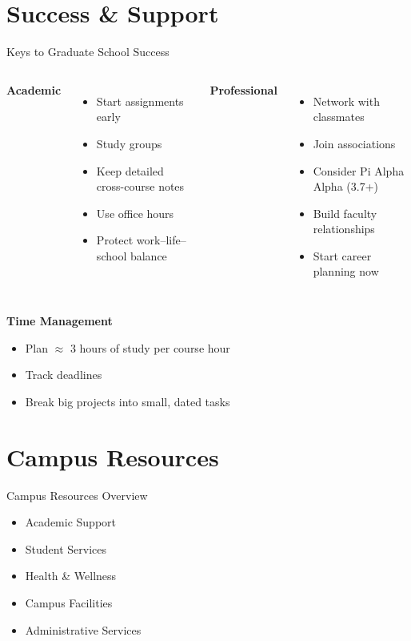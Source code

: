 \documentclass[10pt]{beamer}
\begin{document}
\section{\textcolor{titanorange}{Success \& Support}}
\begin{frame}{Keys to Graduate School Success}
\begin{columns}[T,onlytextwidth]
  \textbf{Academic}
  \begin{itemize}
    \item Start assignments early
    \item Study groups
    \item Keep detailed cross-course notes
    \item Use office hours
    \item Protect work--life--school balance
  \end{itemize}
  \textbf{Professional}
  \begin{itemize}
    \item Network with classmates
    \item Join associations
    \item Consider Pi Alpha Alpha (3.7+)
    \item Build faculty relationships
    \item Start career planning now
  \end{itemize}
\end{columns}

\vspace{0.4em}
\textbf{Time Management}
\begin{itemize}
  \item Plan \(\approx\) 3 hours of study per course hour
  \item Track deadlines
  \item Break big projects into small, dated tasks
\end{itemize}
\end{frame}

\section{\textcolor{titanorange}{Campus Resources}}

\begin{frame}{Campus Resources Overview}
\begin{itemize}
  \item Academic Support
  \item Student Services
  \item Health \& Wellness
  \item Campus Facilities
  \item Administrative Services
\end{itemize}
\end{frame}
\end{document}
